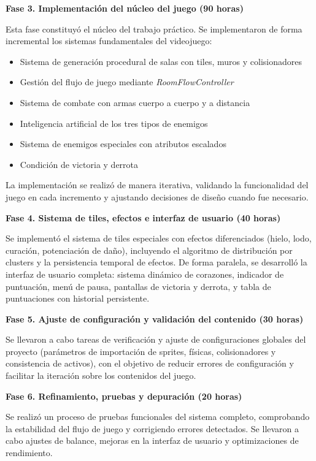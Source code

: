 \textbf{Fase 3. Implementación del núcleo del juego (90 horas)}

Esta fase constituyó el núcleo del trabajo práctico. Se implementaron de forma incremental los sistemas fundamentales del videojuego:

\begin{itemize}
\item Sistema de generación procedural de salas con tiles, muros y colisionadores
\item Gestión del flujo de juego mediante \textit{RoomFlowController}
\item Sistema de combate con armas cuerpo a cuerpo y a distancia
\item Inteligencia artificial de los tres tipos de enemigos
\item Sistema de enemigos especiales con atributos escalados
\item Condición de victoria y derrota
\end{itemize}

La implementación se realizó de manera iterativa, validando la funcionalidad del juego en cada incremento y ajustando decisiones de diseño cuando fue necesario.

\textbf{Fase 4. Sistema de tiles, efectos e interfaz de usuario (40 horas)}

Se implementó el sistema de tiles especiales con efectos diferenciados (hielo, lodo, curación, potenciación de daño), incluyendo el algoritmo de distribución por clusters y la persistencia temporal de efectos. De forma paralela, se desarrolló la interfaz de usuario completa: sistema dinámico de corazones, indicador de puntuación, menú de pausa, pantallas de victoria y derrota, y tabla de puntuaciones con historial persistente.

\textbf{Fase 5. Ajuste de configuración y validación del contenido (30 horas)}

Se llevaron a cabo tareas de verificación y ajuste de configuraciones globales del proyecto (parámetros de importación de sprites, físicas, colisionadores y consistencia de activos), con el objetivo de reducir errores de configuración y facilitar la iteración sobre los contenidos del juego.

\textbf{Fase 6. Refinamiento, pruebas y depuración (20 horas)}

Se realizó un proceso de pruebas funcionales del sistema completo, comprobando la estabilidad del flujo de juego y corrigiendo errores detectados. Se llevaron a cabo ajustes de balance, mejoras en la interfaz de usuario y optimizaciones de rendimiento.


